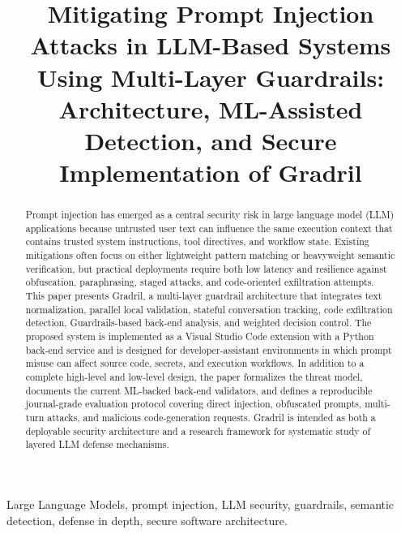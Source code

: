\documentclass[journal]{IEEEtran}
\begin{document}
\title{Mitigating Prompt Injection Attacks in LLM-Based Systems Using Multi-Layer Guardrails: Architecture, ML-Assisted Detection, and Secure Implementation of Gradril}

\author{
}

\maketitle

\begin{abstract}
Prompt injection has emerged as a central security risk in large language model (LLM) applications because untrusted user text can influence the same execution context that contains trusted system instructions, tool directives, and workflow state. Existing mitigations often focus on either lightweight pattern matching or heavyweight semantic verification, but practical deployments require both low latency and resilience against obfuscation, paraphrasing, staged attacks, and code-oriented exfiltration attempts. This paper presents Gradril, a multi-layer guardrail architecture that integrates text normalization, parallel local validation, stateful conversation tracking, code exfiltration detection, Guardrails-based back-end analysis, and weighted decision control. The proposed system is implemented as a Visual Studio Code extension with a Python back-end service and is designed for developer-assistant environments in which prompt misuse can affect source code, secrets, and execution workflows. In addition to a complete high-level and low-level design, the paper formalizes the threat model, documents the current ML-backed back-end validators, and defines a reproducible journal-grade evaluation protocol covering direct injection, obfuscated prompts, multi-turn attacks, and malicious code-generation requests. Gradril is intended as both a deployable security architecture and a research framework for systematic study of layered LLM defense mechanisms.
\end{abstract}

\begin{IEEEkeywords}
Large Language Models, prompt injection, LLM security, guardrails, semantic detection, defense in depth, secure software architecture.
\end{IEEEkeywords}
\end{document}
